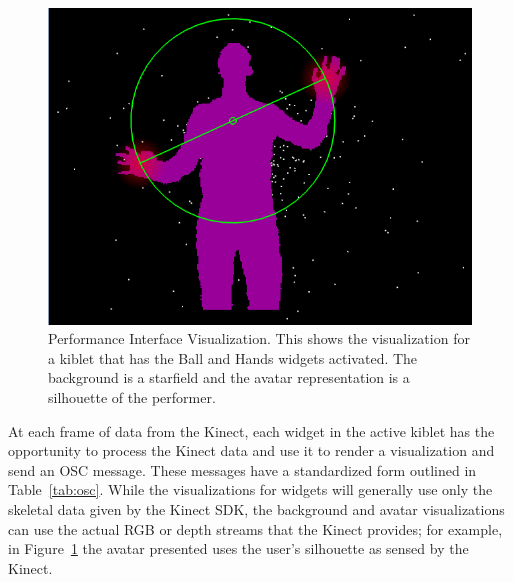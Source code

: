 \documentclass{nime-alternate}
\begin{document}
\begin{figure}
	\centering
		\includegraphics[width=1\columnwidth]{figures/player.png}
	\caption{Performance Interface Visualization. This shows the visualization for a kiblet
that has the Ball and Hands widgets activated. The background is a starfield and the avatar
representation is a silhouette of the performer.}
	\label{fig:player}
\end{figure}

At each frame of data from the Kinect, each widget in the active kiblet has the opportunity to process 
the Kinect data and use it to render a visualization and send an OSC message. These messages
have a standardized form outlined in Table~\ref{tab:osc}.
While the visualizations for widgets will generally use only the skeletal data given by the
Kinect SDK, the background and avatar visualizations can use the actual RGB or depth streams
that the Kinect provides; for example, in Figure~\ref{fig:player} the avatar presented uses the user's
silhouette as sensed by the Kinect. 
\end{document}
